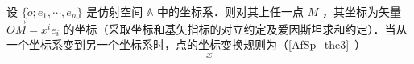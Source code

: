 

设 $\{\dot o;e_1,\cdots,e_n\}$ 是仿射空间 $\mathbb A$ 中的坐标系．则对其上任一点 $M$ ，其坐标为矢量 $\overrightarrow{OM}=x^i e_i$ 的坐标（采取坐标和基矢指标的对立约定及爱因斯坦求和约定）．当从一个坐标系变到另一个坐标系时，点的坐标变换规则为（\autoref{AfSp_the3}~）
\begin{equation}
x
\end{equation}
